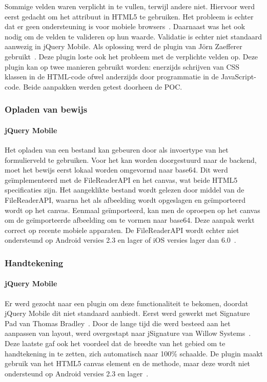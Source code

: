 Sommige velden waren verplicht in te vullen, terwijl andere niet. Hiervoor werd eerst gedacht om het  attribuut in HTML5 te gebruiken. Het probleem is echter dat er geen ondersteuning is voor mobiele browsers~\cite{Deveria2013}. Daarnaast was het ook nodig om de velden te valideren op hun waarde. Validatie is echter niet standaard aanwezig in jQuery Mobile. Als oplossing werd de plugin van Jörn Zaefferer gebruikt~\cite{Zaefferer2013}. Deze plugin loste ook het probleem met de verplichte velden op. Deze plugin kan op twee manieren gebruikt worden: enerzijds schrijven van CSS klassen in de HTML-code ofwel anderzijds door programmatie in de JavaScript-code. Beide aanpakken werden getest doorheen de POC. 

\subsubsection{Opladen van bewijs}

\paragraph{jQuery Mobile} 
Het opladen van een bestand kan gebeuren door  als invoertype van het formulierveld te gebruiken. Voor het kan worden doorgestuurd naar de backend, moet het bewijs eerst lokaal worden omgevormd naar base64. Dit werd geïmplementeerd met de FileReaderAPI en het canvas, wat beide HTML5 specificaties zijn. Het aangeklikte bestand wordt gelezen door middel van de FileReaderAPI, waarna het als afbeelding wordt opgeslagen en geïmporteerd wordt op het canvas. Eenmaal geïmporteerd, kan men de  oproepen op het canvas om de geïmporteerde afbeelding om te vormen naar base64. Deze aanpak werkt correct op recente mobiele apparaten. De FileReaderAPI wordt echter niet ondersteund op Android versies 2.3 en lager of iOS versies lager dan 6.0~\cite{Deveria2013a}.

\subsubsection{Handtekening}

\paragraph{jQuery Mobile} 
Er werd gezocht naar een plugin om deze functionaliteit te bekomen, doordat jQuery Mobile dit niet standaard aanbiedt. Eerst werd gewerkt met Signature Pad van Thomas Bradley~\cite{Bradley2013}. Door de lange tijd die werd besteed aan het aanpassen van layout, werd overgestapt naar jSignature van Willow Systems~\cite{Systems2013}. Deze laatste gaf ook het voordeel dat de breedte van het gebied om te handtekening in te zetten, zich automatisch naar 100\% schaalde. De plugin maakt gebruik van het HTML5 canvas element en de  methode, maar deze wordt niet ondersteund op Android versies 2.3 en lager~\cite{Systems2013}.

